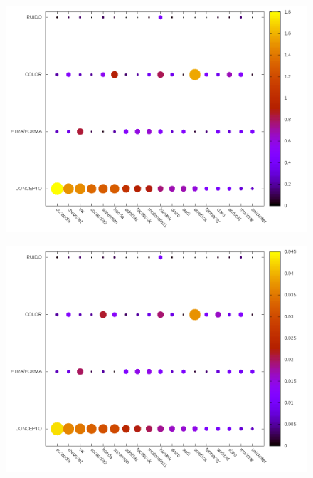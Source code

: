 \documentclass{beamer}
\begin{document}
\begin{frame}
\begin{figure}[h]
 \centering
  \begin{minipage}[c]{1\textwidth}
	\centering	
	\includegraphics[scale=0.4]{target_ir.png}
  \end{minipage}
\end{figure}
\end{frame}

\begin{frame}
\begin{figure}[h]
 \centering
  \begin{minipage}[c]{1\textwidth}
	\centering	
	\includegraphics[scale=0.4]{target_irr.png}
  \end{minipage}
\end{figure}
\end{frame}
\end{document}
